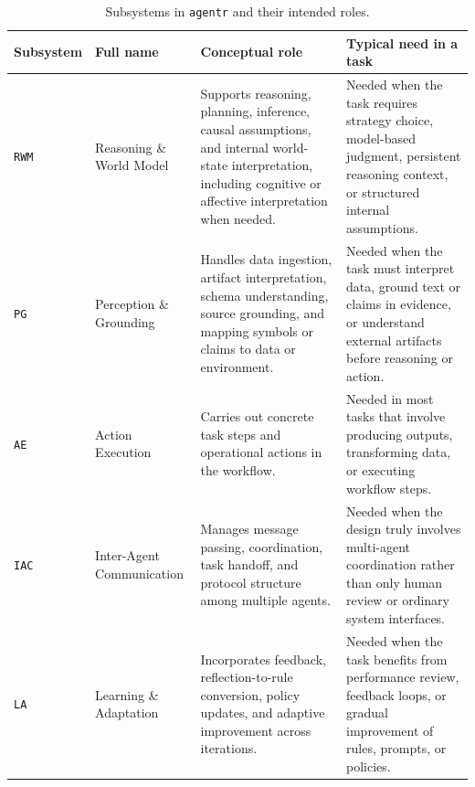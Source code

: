 \begin{table}[htbp]
\centering
\caption{Subsystems in \texttt{agentr} and their intended roles.}
\begin{tabular}{p{1.8cm} p{3.2cm} p{5.2cm} p{5.4cm}}
\hline
\textbf{Subsystem} & \textbf{Full name} & \textbf{Conceptual role} & \textbf{Typical need in a task} \\
\hline
\texttt{RWM} & Reasoning \& World Model & Supports reasoning, planning, inference, causal assumptions, and internal world-state interpretation, including cognitive or affective interpretation when needed. & Needed when the task requires strategy choice, model-based judgment, persistent reasoning context, or structured internal assumptions. \\
\texttt{PG} & Perception \& Grounding & Handles data ingestion, artifact interpretation, schema understanding, source grounding, and mapping symbols or claims to data or environment. & Needed when the task must interpret data, ground text or claims in evidence, or understand external artifacts before reasoning or action. \\
\texttt{AE} & Action Execution & Carries out concrete task steps and operational actions in the workflow. & Needed in most tasks that involve producing outputs, transforming data, or executing workflow steps. \\
\texttt{IAC} & Inter-Agent Communication & Manages message passing, coordination, task handoff, and protocol structure among multiple agents. & Needed when the design truly involves multi-agent coordination rather than only human review or ordinary system interfaces. \\
\texttt{LA} & Learning \& Adaptation & Incorporates feedback, reflection-to-rule conversion, policy updates, and adaptive improvement across iterations. & Needed when the task benefits from performance review, feedback loops, or gradual improvement of rules, prompts, or policies. \\
\hline
\end{tabular}
\end{table}
